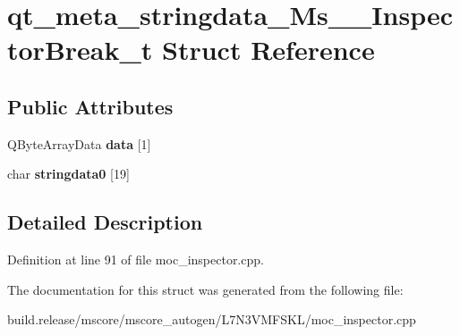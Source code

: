 \hypertarget{structqt__meta__stringdata___ms_____inspector_break__t}{}\section{qt\+\_\+meta\+\_\+stringdata\+\_\+\+Ms\+\_\+\+\_\+\+Inspector\+Break\+\_\+t Struct Reference}
\label{structqt__meta__stringdata___ms_____inspector_break__t}
\subsection*{Public Attributes}
\begin{DoxyCompactItemize}
\item 
\mbox{\label{structqt__meta__stringdata___ms_____inspector_break__t_ad2359ea02849043e88af073bbedc9ca0}} 
Q\+Byte\+Array\+Data {\bfseries data} \mbox{[}1\mbox{]}
\item 
\mbox{\label{structqt__meta__stringdata___ms_____inspector_break__t_aeb1d8e88fa2063ee39548c21f3db86c2}} 
char {\bfseries stringdata0} \mbox{[}19\mbox{]}
\end{DoxyCompactItemize}


\subsection{Detailed Description}


Definition at line 91 of file moc\+\_\+inspector.\+cpp.



The documentation for this struct was generated from the following file\+:\begin{DoxyCompactItemize}
\item 
build.\+release/mscore/mscore\+\_\+autogen/\+L7\+N3\+V\+M\+F\+S\+K\+L/moc\+\_\+inspector.\+cpp\end{DoxyCompactItemize}
